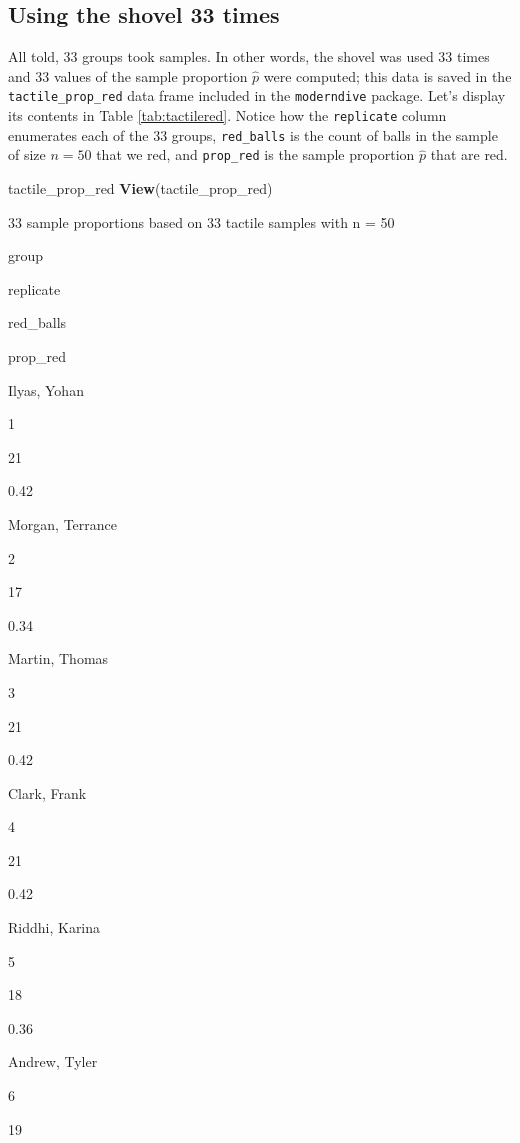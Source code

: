 \documentclass[12pt,]{krantz}
\makeatletter
\newenvironment{Shaded}{\begin{snugshade}}{\end{snugshade}}
\newcommand{\KeywordTok}[1]{\textcolor[rgb]{0.27,0.27,0.27}{\textbf{#1}}}
\newcommand{\NormalTok}[1]{#1}
\newenvironment{kframe}{%
\medskip{}
\setlength{\fboxsep}{.8em}
 \def\at@end@of@kframe{}%
 \ifinner\ifhmode%
  \def\at@end@of@kframe{\end{minipage}}%
  \begin{minipage}{\columnwidth}%
 \fi\fi%
 \def\FrameCommand##1{\hskip\@totalleftmargin \hskip-\fboxsep
 \colorbox{shadecolor}{##1}\hskip-\fboxsep
     \hskip-\linewidth \hskip-\@totalleftmargin \hskip\columnwidth}%
 \MakeFramed {\advance\hsize-\width
   \@totalleftmargin\z@ \linewidth\hsize
   \@setminipage}}%
 {\par\unskip\endMakeFramed%
 \at@end@of@kframe}
\renewenvironment{Shaded}{\begin{kframe}}{\end{kframe}}
\makeatother
\begin{document}
\subsection{Using the shovel 33 times}\label{student-shovels}

All told, 33 groups took samples. In other words, the shovel was used 33
times and 33 values of the sample proportion \(\widehat{p}\) were
computed; this data is saved in the \texttt{tactile\_prop\_red} data
frame included in the \texttt{moderndive} package. Let's display its
contents in Table \ref{tab:tactilered}. Notice how the
\texttt{replicate} column enumerates each of the 33 groups,
\texttt{red\_balls} is the count of balls in the sample of size \(n=50\)
that we red, and \texttt{prop\_red} is the sample proportion
\(\widehat{p}\) that are red.

\begin{Shaded}
\begin{Highlighting}[]
\NormalTok{tactile_prop_red}
\KeywordTok{View}\NormalTok{(tactile_prop_red)}
\end{Highlighting}
\end{Shaded}

\label{tab:tactilered}33 sample proportions based on 33 tactile samples with
n = 50

group

replicate

red\_balls

prop\_red

Ilyas, Yohan

1

21

0.42

Morgan, Terrance

2

17

0.34

Martin, Thomas

3

21

0.42

Clark, Frank

4

21

0.42

Riddhi, Karina

5

18

0.36

Andrew, Tyler

6

19
\end{document}
